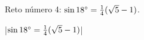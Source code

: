 

\bigskip

\enunciadoS Reto n\'umero 4: 
$\sin 18^\circ = {1 \over 4}(\sqrt5 - 1)$.

\bigskip

\respuestaS

|$\sin 18^\circ = {1 \over 4}(\sqrt5 - 1)$|

\bye

